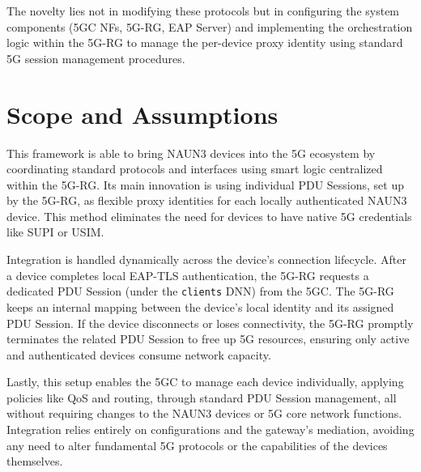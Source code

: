 The novelty lies not in modifying these protocols but in configuring the system components (\ac{5GC} \acp{NF}, \ac{5G-RG}, \ac{EAP} Server) and implementing the orchestration logic within the \ac{5G-RG} to manage the per-device proxy identity using standard \ac{5G} session management procedures.

\section{Scope and Assumptions}

This framework is able to bring \ac{NAUN3} devices into the \ac{5G} ecosystem by coordinating standard protocols and interfaces using smart logic centralized within the \ac{5G-RG}. Its main innovation is using individual \ac{PDU} Sessions, set up by the \ac{5G-RG}, as flexible proxy identities for each locally authenticated \ac{NAUN3} device. This method eliminates the need for devices to have native \ac{5G} credentials like \ac{SUPI} or \ac{USIM}.

Integration is handled dynamically across the device's connection lifecycle. After a device completes local \ac{EAP-TLS} authentication, the \ac{5G-RG} requests a dedicated \ac{PDU} Session (under the \texttt{clients} \ac{DNN}) from the \ac{5GC}. The \ac{5G-RG} keeps an internal mapping between the device's local identity and its assigned \ac{PDU} Session. If the device disconnects or loses connectivity, the \ac{5G-RG} promptly terminates the related \ac{PDU} Session to free up \ac{5G} resources, ensuring only active and authenticated devices consume network capacity.

Lastly, this setup enables the \ac{5GC} to manage each device individually, applying policies like \ac{QoS} and routing, through standard \ac{PDU} Session management, all without requiring changes to the \ac{NAUN3} devices or \ac{5G} core network functions. Integration relies entirely on configurations and the gateway's mediation, avoiding any need to alter fundamental \ac{5G} protocols or the capabilities of the devices themselves.